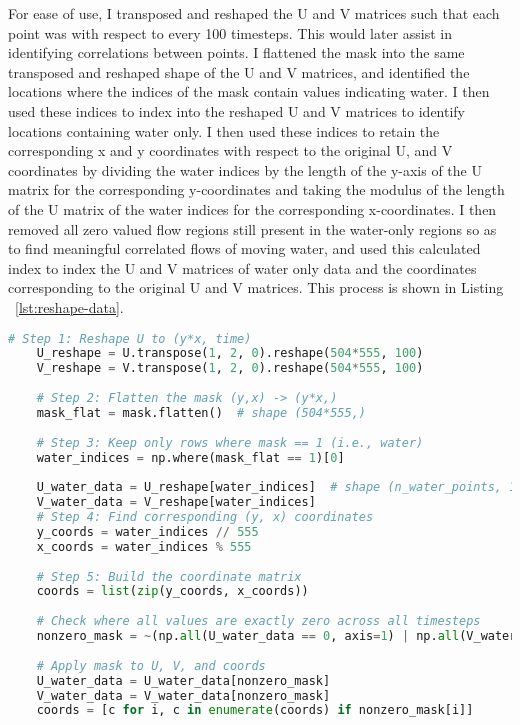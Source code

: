 \documentclass[11pt]{article}
\begin{document}
For ease of use, I transposed and reshaped the U and V matrices such that each point was with respect to every 100 timesteps. This would later assist in identifying correlations between points. I flattened the mask into the same transposed and reshaped shape of the U and V matrices, and identified the locations where the indices of the mask contain values indicating water. I then used these indices to index into the reshaped U and V matrices to identify locations containing water only. I then used these indices to retain the corresponding x and y coordinates with respect to the original U, and V coordinates by dividing the water indices by the length of the y-axis of the U matrix for the corresponding y-coordinates and taking the modulus of the length of the U matrix of the water indices for the corresponding x-coordinates. I then removed all zero valued flow regions still present in the water-only regions so as to find meaningful correlated flows of moving water, and used this calculated index to index the U and V matrices of water only data and the coordinates corresponding to the original U and V matrices. This process is shown in Listing ~\ref{lst:reshape-data}.

\begin{lstlisting}[language=Python, label=lst:reshape-data, caption={Reshaping U, V, and mask, \& retaining original coordinates for the reshaped data.}]
    # Step 1: Reshape U to (y*x, time)
    U_reshape = U.transpose(1, 2, 0).reshape(504*555, 100)
    V_reshape = V.transpose(1, 2, 0).reshape(504*555, 100)
    
    # Step 2: Flatten the mask (y,x) -> (y*x,)
    mask_flat = mask.flatten()  # shape (504*555,)
    
    # Step 3: Keep only rows where mask == 1 (i.e., water)
    water_indices = np.where(mask_flat == 1)[0]
    
    U_water_data = U_reshape[water_indices]  # shape (n_water_points, 100)
    V_water_data = V_reshape[water_indices]
    # Step 4: Find corresponding (y, x) coordinates
    y_coords = water_indices // 555
    x_coords = water_indices % 555
    
    # Step 5: Build the coordinate matrix
    coords = list(zip(y_coords, x_coords))
    
    # Check where all values are exactly zero across all timesteps
    nonzero_mask = ~(np.all(U_water_data == 0, axis=1) | np.all(V_water_data == 0, axis=1))
    
    # Apply mask to U, V, and coords
    U_water_data = U_water_data[nonzero_mask]
    V_water_data = V_water_data[nonzero_mask]
    coords = [c for i, c in enumerate(coords) if nonzero_mask[i]]
    
    \end{lstlisting}
\FloatBarrier
\end{document}
